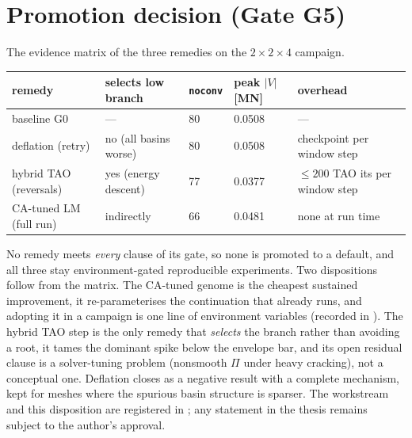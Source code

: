 \section{Promotion decision (Gate G5)}
\label{sec:drv-promotion}

The evidence matrix of the three remedies on the
$2{\times}2{\times}4$ campaign.

\begin{center}
\begin{tabular}{@{}lllll@{}}
\toprule
remedy & selects low branch & \texttt{noconv} & peak $|V|$ [MN] & overhead \\
\midrule
baseline G0            & ---            & 80 & 0.0508 & --- \\
deflation (retry)      & no (all basins worse) & 80 & 0.0508 & checkpoint per window step \\
hybrid TAO (reversals) & yes (energy descent)  & 77 & 0.0377 & $\le 200$ TAO its per window step \\
CA-tuned LM (full run) & indirectly            & 66 & 0.0481 & none at run time \\
\bottomrule
\end{tabular}
\end{center}

No remedy meets \emph{every} clause of its gate, so none is promoted to
a default, and all three stay environment-gated reproducible
experiments. Two dispositions follow from the matrix. The CA-tuned
genome is the cheapest sustained improvement, it re-parameterises the
continuation that already runs, and adopting it in a campaign is one
line of environment variables (recorded in
). The hybrid TAO step is the only remedy
that \emph{selects} the branch rather than avoiding a root, it tames
the dominant spike below the envelope bar, and its open residual clause
is a solver-tuning problem (nonsmooth $\Pi$ under heavy cracking), not
a conceptual one. Deflation closes as a negative result with a complete
mechanism, kept for meshes where the spurious basin structure is
sparser. The workstream and this disposition are registered in
; any statement in
the thesis remains subject to the author's approval.
